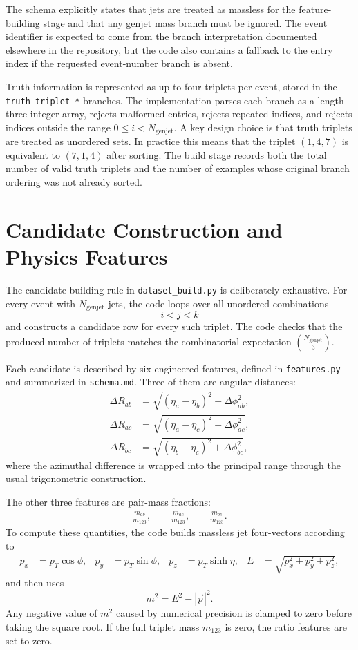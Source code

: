 \documentclass[11pt]{article}
\begin{document}
The schema explicitly states that jets are treated as massless for the feature-building stage and that any genjet mass branch must be ignored. The event identifier is expected to come from the branch interpretation documented elsewhere in the repository, but the code also contains a fallback to the entry index if the requested event-number branch is absent.

Truth information is represented as up to four triplets per event, stored in the \texttt{truth\_triplet\_*} branches. The implementation parses each branch as a length-three integer array, rejects malformed entries, rejects repeated indices, and rejects indices outside the range $0 \le i < N_{\mathrm{genjet}}$. A key design choice is that truth triplets are treated as unordered sets. In practice this means that the triplet $(1,4,7)$ is equivalent to $(7,1,4)$ after sorting. The build stage records both the total number of valid truth triplets and the number of examples whose original branch ordering was not already sorted.

\section{Candidate Construction and Physics Features}

The candidate-building rule in \texttt{dataset\_build.py} is deliberately exhaustive. For every event with $N_{\mathrm{genjet}}$ jets, the code loops over all unordered combinations
\[
i < j < k
\]
and constructs a candidate row for every such triplet. The code checks that the produced number of triplets matches the combinatorial expectation $\binom{N_{\mathrm{genjet}}}{3}$.

Each candidate is described by six engineered features, defined in \texttt{features.py} and summarized in \texttt{schema.md}. Three of them are angular distances:
\begin{align}
\Delta R_{ab} &= \sqrt{(\eta_a - \eta_b)^2 + \Delta \phi_{ab}^2}, \\
\Delta R_{ac} &= \sqrt{(\eta_a - \eta_c)^2 + \Delta \phi_{ac}^2}, \\
\Delta R_{bc} &= \sqrt{(\eta_b - \eta_c)^2 + \Delta \phi_{bc}^2},
\end{align}
where the azimuthal difference is wrapped into the principal range through the usual trigonometric construction.

The other three features are pair-mass fractions:
\begin{align}
\frac{m_{ab}}{m_{123}}, \qquad
\frac{m_{ac}}{m_{123}}, \qquad
\frac{m_{bc}}{m_{123}}.
\end{align}
To compute these quantities, the code builds massless jet four-vectors according to
\begin{align}
p_x &= p_T \cos \phi, &
p_y &= p_T \sin \phi, &
p_z &= p_T \sinh \eta, &
E &= \sqrt{p_x^2 + p_y^2 + p_z^2},
\end{align}
and then uses
\[
m^2 = E^2 - |\vec{p}|^2.
\]
Any negative value of $m^2$ caused by numerical precision is clamped to zero before taking the square root. If the full triplet mass $m_{123}$ is zero, the ratio features are set to zero.
\end{document}
